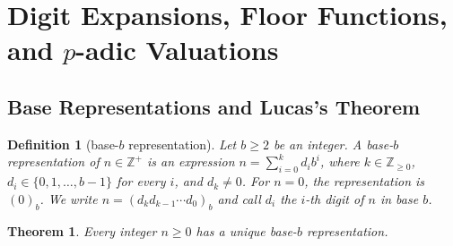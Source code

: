 \documentclass[11pt]{article}
\theoremstyle{ntstyle}
\newtheorem{theorem}{Theorem}[subsection]
\newtheorem{definition}{Definition}[subsection]
\begin{document}
\section{Digit Expansions, Floor Functions, and \texorpdfstring{$p$}{p}-adic Valuations}

\subsection{Base Representations and Lucas's Theorem}

\begin{definition}[base-$b$ representation]\label{def:4.1.1} Let $b\ge2$ be an integer.
	A base-$b$ representation of $n\in\mathbb{Z}^+$ is an expression
	$n=\sum_{i=0}^{k}d_i b^i$, where $k\in\mathbb{Z}_{\ge0}$,
	$d_i\in\{0,1,\ldots,b-1\}$ for every $i$, and $d_k\neq0$.
	For $n=0$, the representation is $(0)_b$. We write
	$n=(d_kd_{k-1}\cdots d_0)_b$ and call $d_i$ the $i$-th digit of $n$ in base $b$.

\end{definition}
\begin{theorem}\label{thm:4.1.1} Every integer $n \ge 0$ has a
	unique base-$b$ representation.

\end{theorem}
\end{document}
